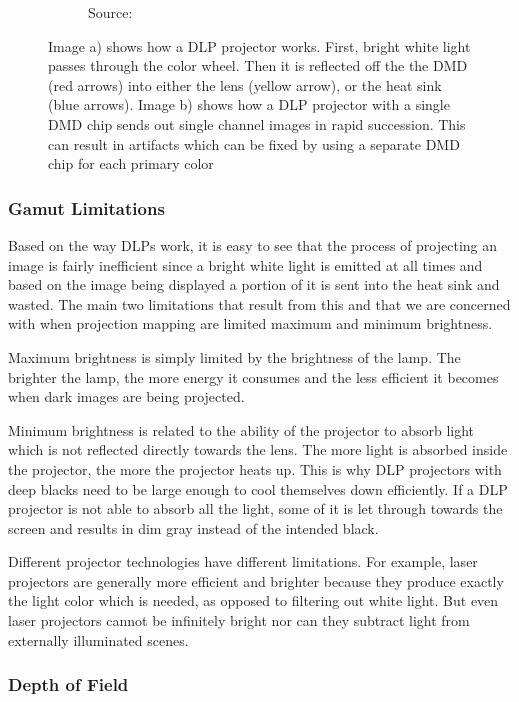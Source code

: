 \begin{figure}[ht]
\begin{subfigure}[b]{0.49\textwidth}
        \caption{Source: \citet{ImageProjectorDLPRainbow}}
    \end{subfigure}
    \caption{Image a) shows how a DLP projector works. First, bright white light passes through the color wheel. Then it is reflected off the the DMD (red arrows) into either the lens (yellow arrow), or the heat sink (blue arrows). Image b) shows how a DLP projector with a single DMD chip sends out single channel images in rapid succession. This can result in artifacts which can be fixed by using a separate DMD chip for each primary color}
    \label{fig:background_projector_dlp}
\end{figure}

\subsubsection{Gamut Limitations}
\label{section:background-projection_mapping-projectors-limitations}

Based on the way DLPs work, it is easy to see that the process of projecting an image is fairly inefficient since a bright white light is emitted at all times and based on the image being displayed a portion of it is sent into the heat sink and wasted. The main two limitations that result from this and that we are concerned with when projection mapping are limited maximum and minimum brightness.

Maximum brightness is simply limited by the brightness of the lamp. The brighter the lamp, the more energy it consumes and the less efficient it becomes when dark images are being projected.

Minimum brightness is related to the ability of the projector to absorb light which is not reflected directly towards the lens. The more light is absorbed inside the projector, the more the projector heats up. This is why DLP projectors with deep blacks need to be large enough to cool themselves down efficiently. If a DLP projector is not able to absorb all the light, some of it is let through towards the screen and results in dim gray instead of the intended black.

Different projector technologies have different limitations. For example, laser projectors are generally more efficient and brighter because they produce exactly the light color which is needed, as opposed to filtering out white light. But even laser projectors cannot be infinitely bright nor can they subtract light from externally illuminated scenes.

\subsubsection{Depth of Field}
\label{section:background-projection_mapping-projectors-dof}

